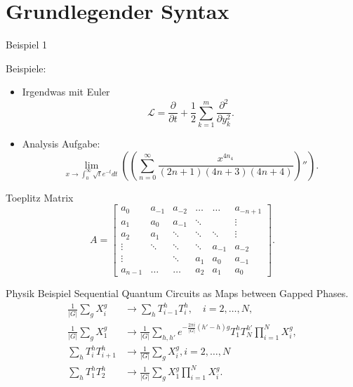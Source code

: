\documentclass{beamer}
\begin{document}
\section{Grundlegender Syntax}
\begin{frame}{Beispiel 1}


Beispiele:
\begin{itemize}
    \item Irgendwas mit Euler \cite{baranek2023randomized}
        \[ \mathcal{L} = \frac{\partial}{\partial t}+ \frac{1}{2}\sum_{k=1}^{m}\frac{\partial^2}{\partial y_{k}^2} .\] 
\end{itemize}


\begin{itemize}
    \item Analysis Aufgabe: 
        \[ \lim_{x\to \int_0^{\infty} \sqrt{t}e^{-t}dt}\left( \left( \sum_{n=0}^{\infty}\frac{x^{4n_4}}{(2n+1)(4n+3)(4n+4)} \right)''  \right) .\] 
\end{itemize}
\end{frame}

    



\begin{frame}
    Toeplitz Matrix
    \[ A=\begin{bmatrix}
            a_0 & a_{-1} & a_{-2} & \ldots & \ldots  &a_{-n+1}  \\
            a_1 & a_0  & a_{-1} &  \ddots   &  &  \vdots \\
            a_2 & a_1 & \ddots  & \ddots & \ddots& \vdots \\ 
            \vdots &  \ddots & \ddots &   \ddots  & a_{-1} & a_{-2}\\
            \vdots &         & \ddots & a_1 & a_0 &  a_{-1} \\
            a_{n-1} &  \ldots & \ldots & a_2 & a_1 & a_0
        \end{bmatrix} .\] 
\end{frame}



\begin{frame}{Physik Beispiel}
    Sequential Quantum Circuits as Maps between Gapped Phases.\cite{chen2023sequential}
    \begin{align*}
        \frac{1}{|G|}\sum_g X^g_i &\to \sum_h T^h_{i-1}T^h_i, \quad i=2,\ldots,N,  \\
        \frac{1}{|G|} \sum_g X_1^g &\to \frac{1}{|G|} \sum_{h,h'}e^{-\frac{2\pi i}{|G|}(h'-h)g}T_1^hT^{h'}_N \prod^N_{i=1}X_i^g,  \\
        \sum_h T^h_i T^h_{i+1} &\to \frac{1}{|G|} \sum_g X_i^g, i=2,\ldots,N  \\
        \sum_h T^h_1 T^h_2 &\to \frac{1}{|G|} \sum_g X_1^g \prod_{i=1}^N X_i^g.
    \end{align*}
\end{frame}
\end{document}
